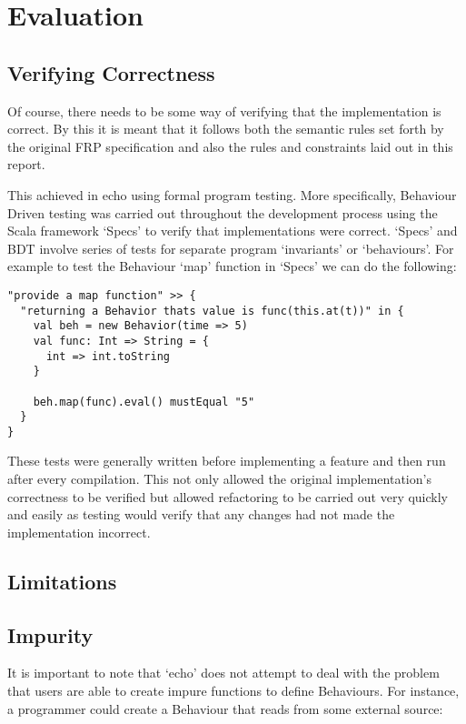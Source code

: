 \chapter{Evaluation}
  
  \section{Verifying Correctness}
    Of course, there needs to be some way of verifying that the implementation is correct. By
    this it is meant that it follows both the semantic rules set forth by the original FRP specification
    and also the rules and constraints laid out in this report.
  
    This achieved in echo using formal program testing. More specifically, Behaviour Driven
    testing was carried out throughout the development process using the Scala framework `Specs'
    to verify that implementations were correct. `Specs' and BDT involve series of tests for
    separate program `invariants' or `behaviours'. For example to test the Behaviour `map' function
    in `Specs' we can do the following:

\begin{verbatim}
"provide a map function" >> {
  "returning a Behavior thats value is func(this.at(t))" in {
    val beh = new Behavior(time => 5)
    val func: Int => String = {
      int => int.toString
    }

    beh.map(func).eval() mustEqual "5"
  }
}
\end{verbatim}      

    These tests were generally written before implementing a feature and then run after every compilation. 
    This not only allowed the original implementation's correctness to be verified but
    allowed refactoring to be carried out very quickly and easily as testing would verify that any changes had not
    made the implementation incorrect.
    
  \section{Limitations}
  
  \section{Impurity}
    It is important to note that `echo' does not attempt to deal with the problem that
    users are able to create impure functions to define Behaviours. For instance, a programmer could
    create a Behaviour that reads from some external source:

